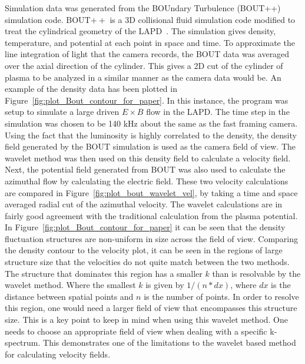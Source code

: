 \documentclass[%
 reprint,
 amsmath,amssymb,
 aps,
]{revtex4-1}
\begin{document}
Simulation data was generated from the BOUndary Turbulence (BOUT++) simulation code. BOUT$++$ is a 3D collisional fluid simulation code modified to treat the cylindrical geometry of the LAPD~\cite{popovich10, friedman12, friedman13}. The simulation gives density, temperature, and potential at each point in space and time. To approximate the line integration of light that the camera records, the BOUT data was averaged over the axial direction of the cylinder. This gives a 2D cut of the cylinder of plasma to be analyzed in a similar manner as the camera data would be. An example of the density data has been plotted in Figure~\ref{fig:plot_Bout_contour_for_paper}. In this instance, the program was setup to simulate a large driven $E \times B$ flow in the LAPD. The time step in the simulation was chosen to be 140 kHz about the same as the fast framing camera. Using the fact that the luminosity is highly correlated to the density, the density field generated by the BOUT simulation is used as the camera field of view. The wavelet method was then used on this density field to calculate a velocity field. Next, the potential field generated from BOUT was also used to calculate the azimuthal flow by calculating the electric field. These two velocity calculations are compared in Figure~\ref{fig:plot_bout_wavelet_vel}, by taking a time and space averaged radial cut of the azimuthal velocity. The wavelet calculations are in fairly good agreement with the traditional calculation from the plasma potential. In Figure~\ref{fig:plot_Bout_contour_for_paper} it can be seen that the density fluctuation structures are non-uniform in size across the field of view. Comparing the density contour to the velocity plot, it can be seen in the regions of large structure size that the velocities do not quite match between the two methods. The structure that dominates this region has a smaller $k$ than is resolvable by the wavelet method. Where the smallest $k$ is given by $1/(n*dx)$, where $dx$ is the distance between spatial points and $n$ is the number of points. In order to resolve this region, one would need a larger field of view that encompasses this structure size. This is a key point to keep in mind when using this wavelet method. One needs to choose an appropriate field of view when dealing with a specific k-spectrum. This demonstrates one of the limitations to the wavelet based method for calculating velocity fields.
\end{document}
